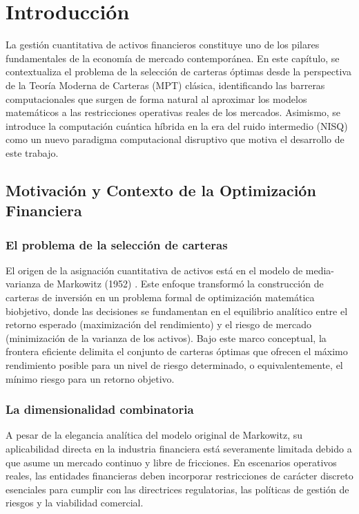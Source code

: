 \chapter{Introducción}
\label{ch:introduccion}

La gestión cuantitativa de activos financieros constituye uno de los pilares fundamentales de la economía de mercado contemporánea. En este capítulo, se contextualiza el problema de la selección de carteras óptimas desde la perspectiva de la Teoría Moderna de Carteras (MPT) clásica, identificando las barreras computacionales que surgen de forma natural al aproximar los modelos matemáticos a las restricciones operativas reales de los mercados. Asimismo, se introduce la computación cuántica híbrida en la era del ruido intermedio (NISQ) como un nuevo paradigma computacional disruptivo que motiva el desarrollo de este trabajo.

\section{Motivación y Contexto de la Optimización Financiera}
\label{sec:motivacion_contexto}

\subsection{El problema de la selección de carteras}
El origen de la asignación cuantitativa de activos está en el modelo de media-varianza de Markowitz (1952) \cite{Markowitz1952}. Este enfoque transformó la construcción de carteras de inversión en un problema formal de optimización matemática biobjetivo, donde las decisiones se fundamentan en el equilibrio analítico entre el retorno esperado (maximización del rendimiento) y el riesgo de mercado (minimización de la varianza de los activos). Bajo este marco conceptual, la frontera eficiente delimita el conjunto de carteras óptimas que ofrecen el máximo rendimiento posible para un nivel de riesgo determinado, o equivalentemente, el mínimo riesgo para un retorno objetivo.

\subsection{La dimensionalidad combinatoria}
A pesar de la elegancia analítica del modelo original de Markowitz, su aplicabilidad directa en la industria financiera está severamente limitada debido a que asume un mercado continuo y libre de fricciones. En escenarios operativos reales, las entidades financieras deben incorporar restricciones de carácter discreto esenciales para cumplir con las directrices regulatorias, las políticas de gestión de riesgos y la viabilidad comercial.

